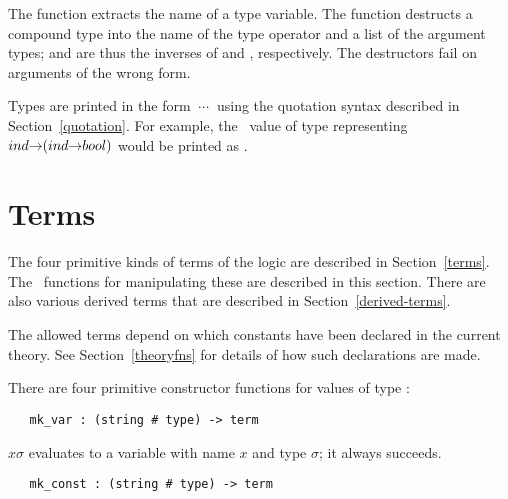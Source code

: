 \noindent The function 
 extracts the name of a type variable.
The function   destructs a  compound type  into the  name of the
type operator  and  a  list  of  the  argument  types;    and
 are  thus the  inverses of   and ,
respectively.  The destructors fail on arguments of the wrong form.


Types are printed
 in the form $\ \cdots\ $
using the quotation syntax described in Section~\ref{quotation}.
For example, the \ML\ value of type  representing
${\sl ind}{\to}({\sl ind}{\to}{\sl bool})$ would be printed
as .

\section{Terms}
\label{avra_terms}

The four primitive kinds of  terms of the logic
are  described in  Section~\ref{terms}.  The
\ML\ functions for manipulating these are described in this section.  There are
also various derived terms that are described in Section~\ref{derived-terms}.

The allowed terms depend on which constants have been declared
in the current theory. See Section~\ref{theoryfns} for details
of how such declarations are made. 

There are four primitive constructor
functions for values of type
:

\begin{boxed}
\begin{verbatim}
   mk_var : (string # type) -> term
\end{verbatim}\end{boxed}

\noindent{}$x$\ml{,}$\sigma$\ml{)} evaluates to a variable with name
$x$ and type $\sigma$; it always succeeds.

\begin{boxed}
\begin{verbatim}
   mk_const : (string # type) -> term
\end{verbatim}\end{boxed}


